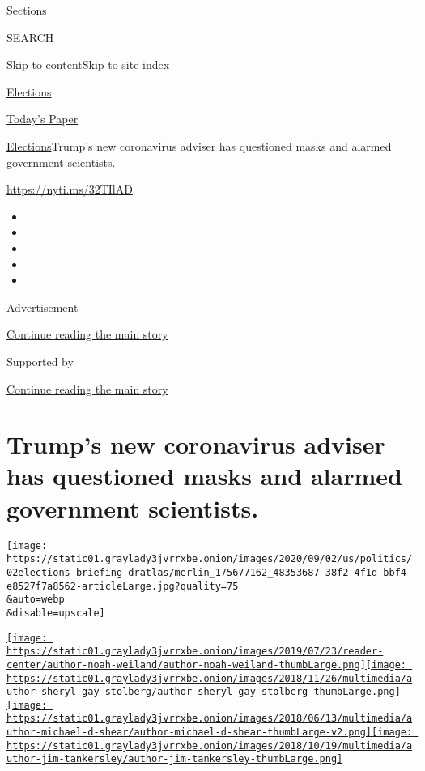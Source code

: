 Sections

SEARCH

\protect\hyperlink{site-content}{Skip to
content}\protect\hyperlink{site-index}{Skip to site index}

\href{https://www.nytimes3xbfgragh.onion/news-event/2020-election}{Elections}

\href{https://myaccount.nytimes3xbfgragh.onion/auth/login?response_type=cookie\&client_id=vi}{}

\href{https://www.nytimes3xbfgragh.onion/section/todayspaper}{Today's
Paper}

\href{/news-event/2020-election}{Elections}\textbar{}Trump's new
coronavirus adviser has questioned masks and alarmed government
scientists.

\url{https://nyti.ms/32TIlAD}

\begin{itemize}
\item
\item
\item
\item
\item
\end{itemize}

Advertisement

\protect\hyperlink{after-top}{Continue reading the main story}

Supported by

\protect\hyperlink{after-sponsor}{Continue reading the main story}

\hypertarget{trumps-new-coronavirus-adviser-has-questioned-masks-and-alarmed-government-scientists}{%
\section{Trump's new coronavirus adviser has questioned masks and
alarmed government
scientists.}\label{trumps-new-coronavirus-adviser-has-questioned-masks-and-alarmed-government-scientists}}

\texttt{[image: https://static01.graylady3jvrrxbe.onion/images/2020/09/02/us/politics/02elections-briefing-dratlas/merlin\_175677162\_48353687-38f2-4f1d-bbf4-e8527f7a8562-articleLarge.jpg?quality=75\\\&auto=webp\\\&disable=upscale]}

\href{https://www.nytimes3xbfgragh.onion/by/noah-weiland}{\texttt{[image: https://static01.graylady3jvrrxbe.onion/images/2019/07/23/reader-center/author-noah-weiland/author-noah-weiland-thumbLarge.png]}}\href{https://www.nytimes3xbfgragh.onion/by/sheryl-gay-stolberg}{\texttt{[image: https://static01.graylady3jvrrxbe.onion/images/2018/11/26/multimedia/author-sheryl-gay-stolberg/author-sheryl-gay-stolberg-thumbLarge.png]}}\href{https://www.nytimes3xbfgragh.onion/by/michael-d-shear}{\texttt{[image: https://static01.graylady3jvrrxbe.onion/images/2018/06/13/multimedia/author-michael-d-shear/author-michael-d-shear-thumbLarge-v2.png]}}\href{https://www.nytimes3xbfgragh.onion/by/jim-tankersley}{\texttt{[image: https://static01.graylady3jvrrxbe.onion/images/2018/10/19/multimedia/author-jim-tankersley/author-jim-tankersley-thumbLarge.png]}}

